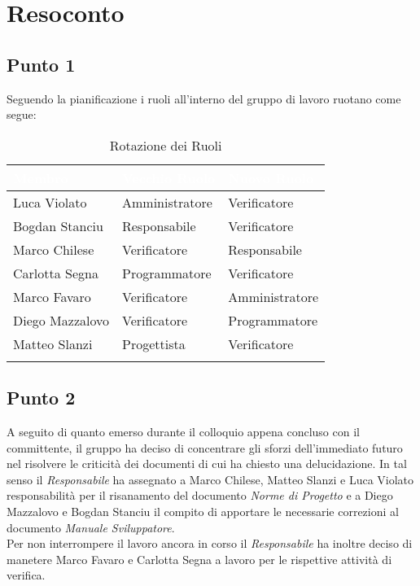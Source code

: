\section{Resoconto}

\subsection{Punto 1}
Seguendo la pianificazione i ruoli all'interno del gruppo di lavoro ruotano come segue:

\begin{center}
	\begin{longtable}[c]{|m{}|m{}|m{}|} 
		\hline
		\rowcolor{bluelogo}\textbf{\textcolor{white}{Membro}} & \textbf{\textcolor{white}{Vecchio Ruolo}} & \textbf{\textcolor{white}{Nuovo Ruolo}}\\
		\hline
		\hline
		Luca Violato & Amministratore & Verificatore \\
		\hline
		\rowcolor{grigio}Bogdan Stanciu & Responsabile & Verificatore \\
		\hline
		Marco Chilese & Verificatore & Responsabile\\
		\hline
		\rowcolor{grigio}Carlotta Segna & Programmatore & Verificatore\\
		\hline
		Marco Favaro & Verificatore & Amministratore \\
		\hline
		\rowcolor{grigio} Diego Mazzalovo & Verificatore & Programmatore\\
		\hline
		Matteo Slanzi & Progettista & Verificatore\\
		\hline
		\caption{Rotazione dei Ruoli}
	\end{longtable}
\end{center}


\subsection{Punto 2}
A seguito di quanto emerso durante il colloquio appena concluso con il committente, il gruppo ha deciso di concentrare gli sforzi dell'immediato futuro nel risolvere le criticità dei documenti di cui ha chiesto una delucidazione.
In tal senso il \textit{Responsabile} ha assegnato a Marco Chilese, Matteo Slanzi e Luca Violato responsabilità per il risanamento del documento \textit{Norme di Progetto} e a Diego Mazzalovo e Bogdan Stanciu il compito di apportare le necessarie correzioni al documento \textit{Manuale Sviluppatore}.\\
Per non interrompere il lavoro ancora in corso il \textit{Responsabile} ha inoltre deciso di manetere Marco Favaro e Carlotta Segna a lavoro per le rispettive attività di verifica.

